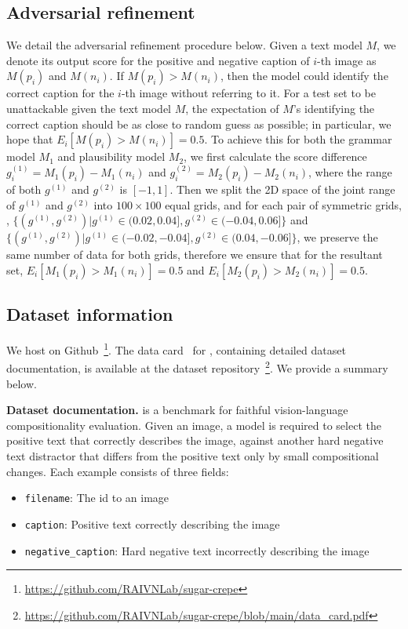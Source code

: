 \subsection{Adversarial refinement}
\label{app:refine}
We detail the adversarial refinement procedure below.
Given a text model $M$, we denote its output score for the positive and negative caption of $i$-th image as $M(p_{i})$ and $M(n_{i})$. If $M(p_{i})>M(n_{i})$, then the model could identify the correct caption for the $i$-th image without referring to it. For a test set to be unattackable given the text model $M$, the expectation of $M$'s identifying the correct caption should be as close to random guess as possible; in particular, we hope that $E_{i}[M(p_{i})>M(n_{i})]=0.5$. To achieve this for both the grammar model $M_1$ and plausibility model $M_2$, we first calculate the score difference $g^{(1)}_i=M_{1}(p_{i})-M_{1}(n_{i})$ and  $g^{(2)}_i=M_{2}(p_{i})-M_{2}(n_{i})$, where the range of both $g^{(1)}$ and $g^{(2)}$ is $[-1, 1]$. Then we split the 2D space of the joint range of  $g^{(1)}$ and $g^{(2)}$ into $100\times 100$ equal grids, and for each pair of symmetric grids, \eg, $\{(g^{(1)}, g^{(2)})|g^{(1)}\in(0.02, 0.04], g^{(2)}\in(-0.04, 0.06]\}$ and $\{(g^{(1)}, g^{(2)})|g^{(1)}\in(-0.02, -0.04], g^{(2)}\in(0.04, -0.06]\}$, we preserve the same number of data for both grids, therefore we ensure that for the resultant set, $E_{i}[M_{1}(p_{i})>M_{1}(n_{i})]=0.5$ and $E_{i}[M_{2}(p_{i})>M_{2}(n_{i})]=0.5$.


\subsection{Dataset information}
We host \method on Github~\footnote{\url{https://github.com/RAIVNLab/sugar-crepe}}.
The data card~\cite{pushkarna2022data} for \method, containing detailed dataset documentation, is available at the dataset repository~\footnote{\url{https://github.com/RAIVNLab/sugar-crepe/blob/main/data_card.pdf}}.
We provide a summary below.

\textbf{Dataset documentation.}
\method is a benchmark for faithful vision-language compositionality evaluation. Given an image, a model is required to select the positive text that correctly describes the image, against another hard negative text distractor that differs from the positive text only by small compositional changes. Each example consists of three fields:
\begin{itemize}
    \item \texttt{filename}: The id to an image
    \item \texttt{caption}: Positive text correctly describing the image
    \item \texttt{negative\_caption}: Hard negative text incorrectly describing the image
\end{itemize}


